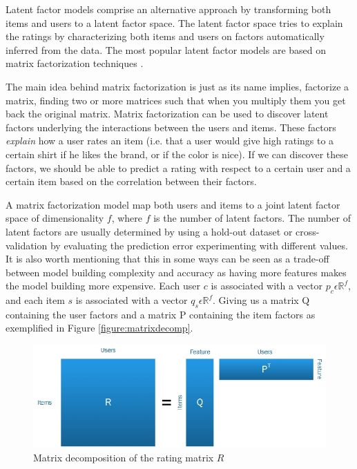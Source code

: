 Latent factor models comprise an alternative approach by transforming both items and users to a latent factor space. The latent factor space tries to explain the ratings by characterizing both items and users on factors automatically inferred from the data. The most popular latent factor models are based on matrix factorization techniques \cite{Koren2009}.

The main idea behind matrix factorization is just as its name implies, factorize a matrix, finding two or more matrices such that when you multiply them you get back the original matrix. Matrix factorization can be used to discover latent factors underlying the interactions between the users and items. These factors \emph{explain} how a user rates an item (i.e. that a user would give high ratings to a certain shirt if he likes the brand, or if the color is nice). If we can discover these factors, we should be able to predict a rating with respect to a certain user and a certain item based on the correlation between their factors.

A matrix factorization model map both users and items to a joint latent factor space of dimensionality $f$, where $f$ is the number of latent factors. The number of latent factors are usually determined by using a hold-out dataset or cross-validation by evaluating the prediction error experimenting with different values. It is also worth mentioning that this in some ways can be seen as a trade-off between model building complexity and accuracy as having more features makes the model building more expensive. Each user $c$ is associated with a vector $p_{c} \epsilon \mathbb{R}^{f}$, and each item $s$ is associated with a vector $q_{s} \epsilon \mathbb{R}^{f}$. Giving us a matrix Q containing the user factors and a matrix P containing the item factors as exemplified in Figure \ref{figure:matrixdecomp}.


\begin{figure}[H]
    \includegraphics[width=5in]{image/matrixdecomp.jpg}
    \centering
    \caption[Matrix decomposition of the rating matrix $R$]{Matrix decomposition of the rating matrix $R$}
    \label{figure:ratingmatrix}
\end{figure}

